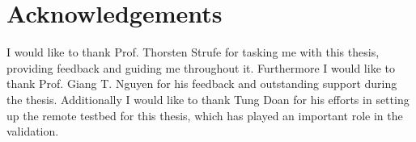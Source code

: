 \chapter*{Acknowledgements}

I would like to thank Prof. Thorsten Strufe for tasking me with this thesis, providing feedback and guiding me throughout it. Furthermore I would like to thank Prof. Giang T. Nguyen for his feedback and outstanding support during the thesis. Additionally I would like to thank Tung Doan for his efforts in setting up the remote testbed for this thesis, which has played an important role in the validation.